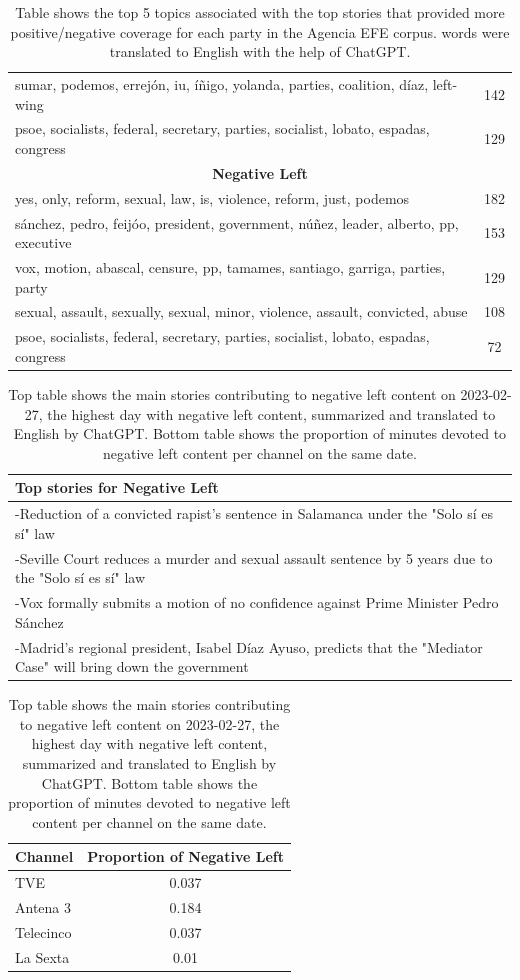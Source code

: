 \documentclass[12pt]{article}
\begin{document}
\begin{table}[h!]
\begin{tabular}{|l|c|}
		sumar, podemos, errejón, iu, íñigo, yolanda, parties, coalition, díaz, left-wing & 142 \\
		psoe, socialists, federal, secretary, parties, socialist, lobato, espadas, congress & 129 \\
		\hline
		\multicolumn{2}{|c|}{\textbf{Negative Left}} \\
		\hline
		yes, only, reform, sexual, law, is, violence, reform, just, podemos & 182 \\
		sánchez, pedro, feijóo, president, government, núñez, leader, alberto, pp, executive & 153 \\
		vox, motion, abascal, censure, pp, tamames, santiago, garriga, parties, party & 129 \\
		sexual, assault, sexually, sexual, minor, violence, assault, convicted, abuse & 108 \\
		psoe, socialists, federal, secretary, parties, socialist, lobato, espadas, congress & 72 \\
		\hline
	\end{tabular}
	\caption{Table shows the top 5 topics associated with the top stories that provided more positive/negative coverage for each party in the Agencia EFE corpus. words were translated to English with the help of ChatGPT. }
\end{table}

	
	
	
		\begin{table}[h!]
		\centering
		\begin{tabular}{p{}}
			\toprule
			\textbf{Top stories for  Negative Left}  \\
			\midrule
			-Reduction of a convicted rapist’s sentence in Salamanca under the "Solo sí es sí" law  \\
			-Seville Court reduces a murder and sexual assault sentence by 5 years due to the "Solo sí es sí" law  \\
			-Vox formally submits a motion of no confidence against Prime Minister Pedro Sánchez  \\
			-Madrid’s regional president, Isabel Díaz Ayuso, predicts that the "Mediator Case" will bring down the government  \\
			\bottomrule
		\end{tabular}
		\begin{tabular}{l c}
			\toprule
			\textbf{Channel} & \textbf{Proportion of Negative Left} \\
			\midrule
			TVE & 0.037 \\
			Antena 3  & 0.184 \\
			Telecinco  & 0.037 \\
			La Sexta  & 0.01 \\
			\bottomrule
		\end{tabular}
		\caption{Top table shows the main stories contributing to negative left content on 2023-02-27, the highest day with negative left content,  summarized and translated to English by ChatGPT. Bottom table shows the proportion of minutes devoted to negative left content per channel on the same date.}
		\label{tab:neg_left_channels}
	\end{table}
	
\end{document}
